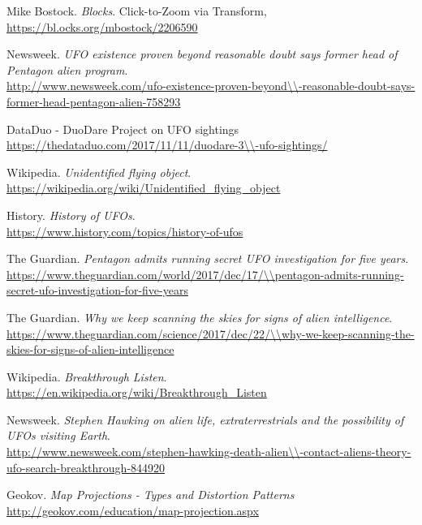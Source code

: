 \documentclass[journal]{vgtc}                %
\begin{document}
\begin{thebibliography}{9}

Mike Bostock.
\textit{Blocks}. 
Click-to-Zoom via Transform,
\\\url{https://bl.ocks.org/mbostock/2206590}

Newsweek.
\textit{UFO existence proven beyond reasonable doubt says former head of Pentagon alien program}.
\\\url{http://www.newsweek.com/ufo-existence-proven-beyond\\-reasonable-doubt-says-former-head-pentagon-alien-758293}

DataDuo - DuoDare Project on UFO sightings
\\\url{https://thedataduo.com/2017/11/11/duodare-3\\-ufo-sightings/}

Wikipedia.
\textit{Unidentified flying object}.
\\\url{https://wikipedia.org/wiki/Unidentified\_flying\_object}

History.
\textit{History of UFOs}.
\\\url{https://www.history.com/topics/history-of-ufos}

The Guardian.
\textit{Pentagon admits running secret UFO investigation for five years}.
\\\url{https://www.theguardian.com/world/2017/dec/17/\\pentagon-admits-running-secret-ufo-investigation-for-five-years}

The Guardian.
\textit{Why we keep scanning the skies for signs of alien intelligence}.
\\\url{https://www.theguardian.com/science/2017/dec/22/\\why-we-keep-scanning-the-skies-for-signs-of-alien-intelligence}

Wikipedia.
\textit{Breakthrough Listen}.
\\\url{https://en.wikipedia.org/wiki/Breakthrough\_Listen}

Newsweek.
\textit{Stephen Hawking on alien life, extraterrestrials and the possibility of UFOs visiting Earth}.
\\\url{http://www.newsweek.com/stephen-hawking-death-alien\\-contact-aliens-theory-ufo-search-breakthrough-844920}

Geokov.
\textit{Map Projections - Types and Distortion Patterns}
\\\url{http://geokov.com/education/map-projection.aspx}


\end{thebibliography}
\end{document}
